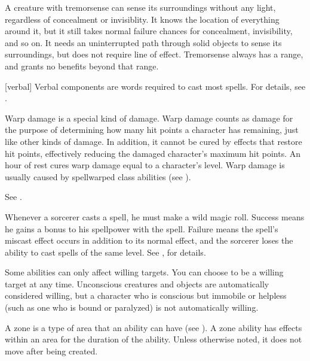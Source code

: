  A creature with tremorsense can sense its surroundings without any light, regardless of concealment or invisiblity.
It knows the location of everything around it, but it still takes normal failure chances for concealment, invisibility, and so on.
It needs an uninterrupted path through solid objects to sense its surroundings, but does not require line of effect.
Tremorsense always has a range, and grants no benefits beyond that range.

[verbal] Verbal components are words required to cast most spells.
For details, see .

 Warp damage is a special kind of damage.
Warp damage counts as damage for the purpose of determining how many hit points a character has remaining, just like other kinds of damage.
In addition, it cannot be cured by effects that restore hit points, effectively reducing the damaged character's maximum hit points.
An hour of rest cures warp damage equal to a character's level.
Warp damage is usually caused by spellwarped class abilities (see ).

 See .

 Whenever a sorcerer casts a spell, he must make a wild magic roll.
Success means he gains a bonus to his spellpower with the spell.
Failure means the spell's miscast effect occurs in addition to its normal effect, and the sorcerer loses the ability to cast spells of the same level.
See , for details.

 Some abilities can only affect willing targets. You can choose to be a willing target at any time. Unconscious creatures and objects are automatically considered willing, but a character who is conscious but immobile or helpless (such as one who is bound or paralyzed) is not automatically willing.

 A zone is a type of area that an ability can have (see ).
A zone ability has effects within an area for the duration of the ability.
Unless otherwise noted, it does not move after being created.
